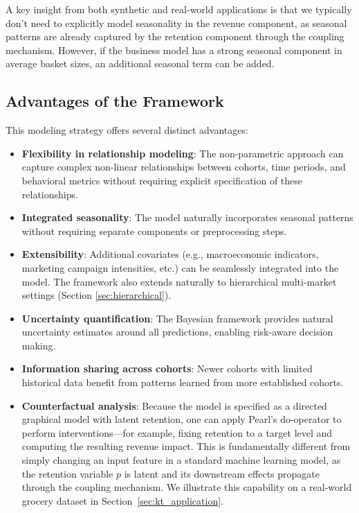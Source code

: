 \documentclass[11pt]{amsart}
\theoremstyle{definition}
\begin{document}
A key insight from both synthetic and real-world applications is that we typically don't need to explicitly
model seasonality in the revenue component, as seasonal patterns are already captured by the retention component
through the coupling mechanism. However, if the business model has a strong seasonal component in average basket sizes, 
an additional seasonal term can be added.

\subsection{Advantages of the Framework}

This modeling strategy offers several distinct advantages:

\begin{itemize}
    \item \textbf{Flexibility in relationship modeling}: The non-parametric approach
          can capture complex non-linear relationships between cohorts, time periods, and behavioral metrics without requiring
          explicit specification of these relationships.

    \item \textbf{Integrated seasonality}: The model naturally incorporates seasonal patterns without requiring separate
          components or preprocessing steps.

    \item \textbf{Extensibility}: Additional covariates (e.g., macroeconomic indicators, marketing campaign intensities, etc.) can
          be seamlessly integrated into the model. The framework also extends naturally to hierarchical multi-market 
          settings (Section \ref{sec:hierarchical}).

    \item \textbf{Uncertainty quantification}: The Bayesian framework provides natural uncertainty estimates around all
          predictions, enabling risk-aware decision making.

    \item \textbf{Information sharing across cohorts}: Newer cohorts with limited historical data benefit from patterns
          learned from more established cohorts.

    \item \textbf{Counterfactual analysis}: Because the model is specified as a directed graphical model with
          latent retention, one can apply Pearl's $\text{do}$-operator \cite{pearl2009causality} to perform
          interventions---for example, fixing retention to a target level and computing the resulting revenue
          impact. This is fundamentally different from simply changing an input feature in a standard machine
          learning model, as the retention variable $p$ is latent and its downstream effects propagate through
          the coupling mechanism. We illustrate this capability on a real-world grocery dataset in
          Section~\ref{sec:kt_application}.
\end{itemize}
\end{document}
